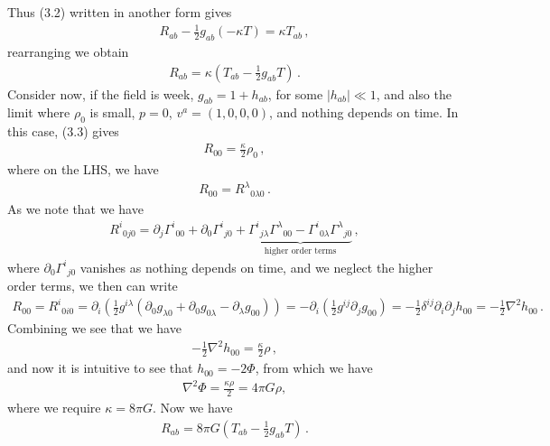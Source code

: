 \documentclass[11pt, onesided]{book}
\theoremstyle{break}
\theoremstyle{break}
\newcommand{\pd}{\partial}
\begin{document}
Thus (3.2) written in another form gives
\begin{align*}
R_{ab} - \frac{1}{2}g_{ab}(-\kappa T) = \kappa T_{ab}\,,
\end{align*}
rearranging we obtain
\begin{align}
R_{ab} = \kappa\left( T_{ab} - \frac{1}{2}g_{ab}T\right)\,.
\end{align}
Consider now, if the field is week, $g_{ab} = 1 + h_{ab}$, for some $|h_{ab}| \ll 1$, and also the limit where $\rho_0$ is small, $p = 0$, $v^a = (1,0,0,0)$, and nothing depends on time. In this case, (3.3) gives
\begin{align*}
R_{00} = \frac{\kappa}{2}\rho_0\,,
\end{align*}
where on the LHS, we have
\begin{align*}
R_{00} = R^{\lambda}{}_{0\lambda 0}\,.
\end{align*}
As we note that we have
\begin{align*}
R^i{}_{0j0} = \pd_j \Gamma^i{}_{00} + \pd_0 \Gamma^{i}{}_{j0} + \underbrace{\Gamma^{i}{}_{j\lambda}\Gamma^{\lambda}{}_{00} - \Gamma^i{}_{0\lambda}\Gamma^{\lambda}{}_{j0}}_{\text{higher order terms}}\,,
\end{align*}
where $\pd_0 \Gamma^{i}{}_{j0} $ vanishes as nothing depends on time, and we neglect the higher order terms, we then can write
\begin{align*}
R_{00} = R^i{}_{0i0} = \pd_i \left( \frac{1}{2}g^{i\lambda}\left(\pd_0 g_{\lambda0}+\pd_0 g_{0\lambda} -\pd_\lambda g_{00}\right)\right) = -\pd_i \left(\frac{1}{2} g^{ij}\pd_j g_{00}\right) = -\frac{1}{2}\delta^{ij}\pd_i\pd_j h_00 = -\frac{1}{2}\nabla^2 h_{00}\,.
\end{align*}
Combining we see that we have
\begin{align*}
-\frac{1}{2}\nabla^2 h_00 = \frac{\kappa}{2}\rho\,,
\end{align*}
and now it is intuitive to see that $h_{00} = -2\Phi$, from which we have
\begin{align*}
\nabla^2 \Phi = \frac{\kappa \rho}{2} = 4\pi G\rho,
\end{align*}
where we require $\kappa = 8\pi G$. Now we have
\begin{align}
R_{ab} = 8\pi G\left( T_{ab} - \frac{1}{2}g_{ab}T\right)\,.
\end{align}
\end{document}
